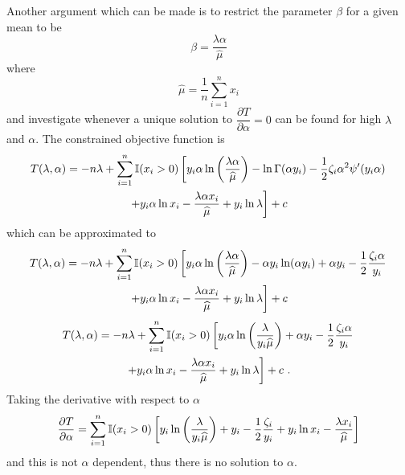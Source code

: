 \documentclass[12pt, a4paper]{memoir}
\begin{document}
Another argument which can be made is to restrict the parameter $\beta$ for a given mean to be
\begin{equation}
	\beta = \frac{\lambda\alpha}{\widehat{\mu}}
	\label{eq:compoundPoisson:beta_restrict}
\end{equation}
where
\begin{equation}
	\widehat{\mu} = \frac{1}{n}\sum_{i=1}^n x_i
\end{equation}
and investigate whenever a unique solution to $\dfrac{\partial T}{\partial \alpha} = 0$ can be found for high $\lambda$ and $\alpha$. The constrained objective function is
\begin{multline*}
	T(\lambda,\alpha)
	=
	-n\lambda+
	\sum_{i=1}^n
	\mathbb{I}(x_i>0)
	\left[
	y_i\alpha
	\ln\left(\frac{\lambda\alpha}{\widehat{\mu}}\right)-\ln\Gamma(\alpha y_i) - \frac{1}{2}\zeta_i\alpha^2\psi'(y_i\alpha)
	\right.
	\\
	\left.
		+y_i\alpha\ln x_i - \frac{\lambda\alpha x_i}{\widehat{\mu}}
		+ y_i \ln \lambda
		\vphantom{\frac{1}{1}}
	\right]
	+ c
\end{multline*}
which can be approximated to
\begin{multline*}
	T(\lambda,\alpha)=
	-n\lambda+
	\sum_{i=1}^n
	\mathbb{I}(x_i>0)
	\left[
		y_i\alpha\ln\left(\frac{\lambda\alpha}{\widehat{\mu}}\right)-\alpha y_i\ln(\alpha y_i) + \alpha y_i - \frac{1}{2}\frac{\zeta_i\alpha}{y_i}
	\right.
	\\
	\left.
		+y_i\alpha\ln x_i - \frac{\lambda\alpha x_i}{\widehat{\mu}}
		+ y_i \ln \lambda
		\vphantom{\frac{1}{1}}
	\right]
	+ c
\end{multline*}
\begin{multline*}
	T(\lambda,\alpha)=
	-n\lambda+
	\sum_{i=1}^n
	\mathbb{I}(x_i>0)
	\left[
		y_i\alpha\ln\left(\frac{\lambda}{y_i\widehat{\mu}}\right) + \alpha y_i - \frac{1}{2}\frac{\zeta_i\alpha}{y_i}
	\right.
	\\
	\left.
		+y_i\alpha\ln x_i - \frac{\lambda\alpha x_i}{\widehat{\mu}}
		+ y_i \ln \lambda
		\vphantom{\frac{1}{1}}
	\right]
	+ c
	\ .
\end{multline*}
Taking the derivative with respect to $\alpha$
\begin{equation*}
	\frac{\partial T}{\partial \alpha} =
	\sum_{i=1}^n
	\mathbb{I}(x_i>0)
	\left[
		y_i\ln\left(\frac{\lambda}{y_i\widehat{\mu}}\right)
		+ y_i - \frac{1}{2}\frac{\zeta_i}{y_i}
		+y_i\ln x_i - \frac{\lambda x_i}{\widehat{\mu}}
		\vphantom{\frac{1}{1}}
	\right]
\end{equation*}
and this is not $\alpha$ dependent, thus there is no solution to $\alpha$.
\end{document}

